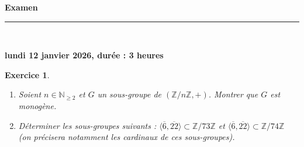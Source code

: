 \documentclass[11pt,a4paper]{article}
\title{}
\date{}
\newtheorem{ex}{Exercice}
\newcommand{\HRule}{\rule{\linewidth}{0.5mm}}
\begin{document}
\pagestyle{fancy}

\fancyhead{}
 \fancyfoot{}


\newcommand{\lb}{\llbracket}
\newcommand{\rb}{\rrbracket}
\newcommand{\KK}{\mathbb{K}}
\newcommand{\N}{\mathbb{N}}
\newcommand{\Z}{\mathbb{Z}}




\newcommand{\md}[3]{#1\ \equiv \ #2 \! \! \! \! \! \pmod {#3} }
\newcommand{\nmd}[3]{#1 \not \equiv #2 \! \! \! \! \!  \pmod {#3} }
\newcommand{\mda}[3]{#1 \equiv #2 \! \!  \pmod {#3} }
\newcommand{\nmda}[3]{#1 \not \equiv #2 \! \! \pmod {#3} }
\newcommand{\mo}[2]{#1 \! \! \! \! \! \pmod #2 }
\newcommand{\moa}[2]{#1 \! \!  \pmod {#2} }

\thispagestyle{fancy}

\begin{center}
    { \huge \bfseries
Examen
     \\ [0cm] }
    \HRule \\[0.5cm]
\end{center}






\begin{center}
\textbf{lundi 12 janvier 2026, durée : 3 heures}

\end{center}


\begin{ex}\label{monogeneite}


\begin{enumerate}

\item Soient $n\in \N_{\geq 2}$ et $G$ un sous-groupe de $(\Z/n\Z,+)$. Montrer que $G$ est monogène.

\item Déterminer les sous-groupes suivants : $\langle \overline{6},\overline{22}\rangle\subset \Z/73\Z$ et $\langle \overline{6},\overline{22}\rangle\subset \Z/74\Z$ (on précisera notamment les cardinaux de ces sous-groupes). 
\end{enumerate}

\end{ex}
\end{document}
